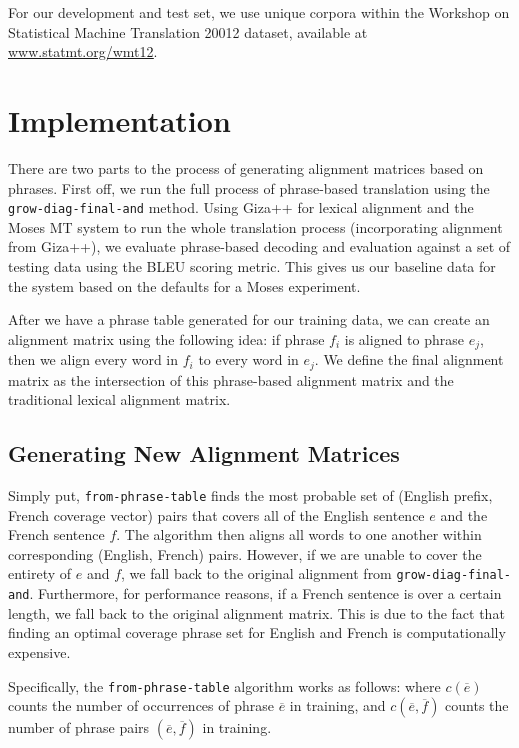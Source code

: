 \documentclass[twocolumn]{article}
\newcommand{\originalAlign}{\texttt{grow-diag-final-and}}
\newcommand{\phraseAlign}{\texttt{from-phrase-table}}
\begin{document}
For our development and test set, we use unique corpora within the Workshop on
Statistical Machine Translation 20012 dataset, available at
\href{http://www.statmt.org/wmt12/dev.tgz}
     {\underline{www.statmt.org/wmt12}}.


\section{Implementation}
There are two parts to the process of generating alignment matrices based on
phrases. First off, we run the full process of phrase-based translation using
the \originalAlign{} method. Using Giza++ for lexical alignment and the Moses MT
system to run the whole translation process (incorporating alignment from
Giza++), we evaluate phrase-based decoding and evaluation against a set of
testing data using the BLEU scoring metric. This gives us our baseline data for
the system based on the defaults for a Moses experiment.

After we have a phrase table generated for our training data, we can create an
alignment matrix using the following idea: if phrase $f_i$ is aligned to phrase
$e_j$, then we align every word in $f_i$ to every word in $e_j$. We define the
final alignment matrix as the intersection of this phrase-based alignment matrix
and the traditional lexical alignment matrix.


\subsection{Generating New Alignment Matrices}
Simply put, \phraseAlign{} finds the most probable set of
(English prefix, French coverage vector) pairs that covers all of the English
sentence $e$ and the French sentence $f$. The algorithm then aligns all words to
one another within corresponding (English, French) pairs. However, if we are
unable to cover the entirety of $e$ and $f$, we fall back to the original
alignment from \originalAlign{}. Furthermore, for performance reasons, if a
French sentence is over a certain length, we fall back to the original alignment
matrix. This is due to the fact that finding an optimal coverage phrase set for
English and French is computationally expensive.

Specifically, the \phraseAlign{} algorithm works as follows:
\wrapSmall{\[ \phrasePairNorm{} \]}
where $c(\overline{e})$ counts the number of occurrences of phrase
$\overline{e}$ in training,
and $c(\overline{e},\overline{f})$ counts the number of phrase pairs
$(\overline{e},\overline{f})$ in training. \\
\end{document}
